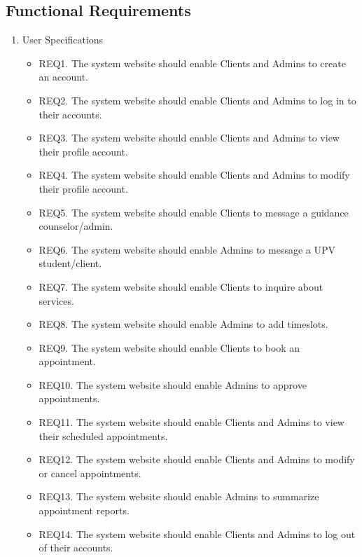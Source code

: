 \subsection{Functional Requirements}
	\begin{enumerate}
	\item User Specifications 
		\begin{itemize}
		\item REQ1. The system website should enable Clients and Admins to create an account. 
		\item REQ2. The system website should enable Clients and Admins to log in to their accounts. 
		\item REQ3. The system website should enable Clients and Admins to view their profile account. 
		\item REQ4. The system website should enable Clients and Admins to modify their profile account. 
		\item REQ5. The system website should enable Clients to message a guidance counselor/admin. 
		\item REQ6. The system website should enable Admins to message a UPV student/client.  
		\item REQ7. The system website should enable Clients to inquire about services. 
		\item REQ8. The system website should enable Admins to add timeslots. 
		\item REQ9. The system website should enable Clients to book an appointment. 
		\item REQ10. The system website should enable Admins to approve appointments. 
		\item REQ11. The system website should enable Clients and Admins to view their scheduled appointments. 
		\item REQ12. The system website should enable Clients and Admins to modify or cancel appointments. 
		\item REQ13. The system website should enable Admins to summarize appointment reports. 
		\item REQ14. The system website should enable Clients and Admins to log out of their accounts. 
		\end{itemize}


\end{enumerate}
